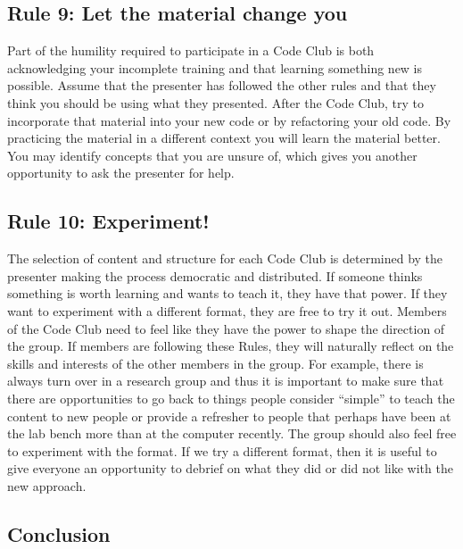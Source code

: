\documentclass[
  11pt,
]{article}
\begin{document}
\hypertarget{rule-9-let-the-material-change-you}{%
\subsection{Rule 9: Let the material change
you}\label{rule-9-let-the-material-change-you}}

Part of the humility required to participate in a Code Club is both
acknowledging your incomplete training and that learning something new
is possible. Assume that the presenter has followed the other rules and
that they think you should be using what they presented. After the Code
Club, try to incorporate that material into your new code or by
refactoring your old code. By practicing the material in a different
context you will learn the material better. You may identify concepts
that you are unsure of, which gives you another opportunity to ask the
presenter for help.

\hypertarget{rule-10-experiment}{%
\subsection{Rule 10: Experiment!}\label{rule-10-experiment}}

The selection of content and structure for each Code Club is determined
by the presenter making the process democratic and distributed. If
someone thinks something is worth learning and wants to teach it, they
have that power. If they want to experiment with a different format,
they are free to try it out. Members of the Code Club need to feel like
they have the power to shape the direction of the group. If members are
following these Rules, they will naturally reflect on the skills and
interests of the other members in the group. For example, there is
always turn over in a research group and thus it is important to make
sure that there are opportunities to go back to things people consider
``simple'' to teach the content to new people or provide a refresher to
people that perhaps have been at the lab bench more than at the computer
recently. The group should also feel free to experiment with the format.
If we try a different format, then it is useful to give everyone an
opportunity to debrief on what they did or did not like with the new
approach.

\hypertarget{conclusion}{%
\subsection{Conclusion}\label{conclusion}}
\end{document}
